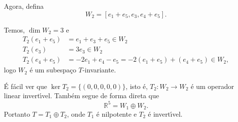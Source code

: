 \documentclass[12pt]{article}
\newcommand{\real}{\mathbb{R}}
\begin{document}
Agora, defina
\[
    W_2 = [e_1 + e_5, e_3, e_4 + e_5].
\]

Temos, $\dim W_2 = 3$ e
\begin{align*}
    T_2(e_1 + e_5) &= e_1 + e_3 + e_5 \in W_2\\
    T_2(e_3) &= 3e_3 \in W_2\\
    T_2(e_4 + e_5) &= -2e_1 + e_4 - e_5 = -2(e_1 + e_5) + (e_4 + e_5) \in W_2,
\end{align*}
logo $W_2$ \'e um subespa\c{c}o $T$-invariante.

\'E f\'acil ver que $\ker T_2 = \{(0,0,0,0,0)\}$, isto \'e, $T_2 : W_2 \to W_2$ \'e um operador linear invert{\'\i}vel. Tamb\'em segue de forma direta que
\[
    \real^5 = W_1 \oplus W_2.
\]
Portanto $T = T_1 \oplus T_2$, onde $T_1$ \'e nilpotente e $T_2$ \'e invert{\'\i}vel.
\end{document}
